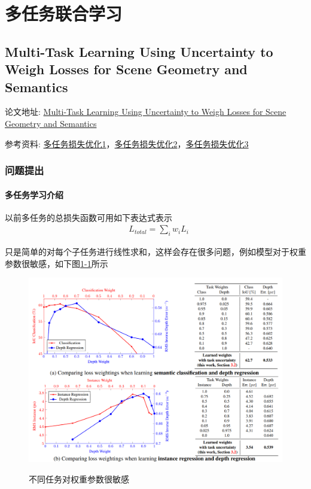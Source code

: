 \chapter{多任务联合学习}

\section{Multi-Task Learning Using Uncertainty to Weigh Losses for Scene Geometry and Semantics}

论文地址: \href{https://arxiv.org/abs/1705.07115v3}{Multi-Task Learning Using Uncertainty to Weigh Losses for Scene Geometry and Semantics}

参考资料: \href{https://zhuanlan.zhihu.com/p/65137250}{多任务损失优化1}，\href{https://blog.csdn.net/cdknight_happy/article/details/102618883}{多任务损失优化2}，\href{https://blog.csdn.net/qq_41214679/article/details/110750812}{多任务损失优化3}

\subsection{问题提出}

\subsubsection{多任务学习介绍}

以前多任务的总损失函数可用如下表达式表示
\begin{align}
& L_{total} = \sum_i w_iL_i
\end{align}

只是简单的对每个子任务进行线性求和，这样会存在很多问题，例如模型对于权重参数很敏感，如下图\href{fig:1-1}{1-1}所示
\begin{figure}
  \centering
  \includegraphics[width=4.5in]{figure/example/2.png}\\
  \caption{不同任务对权重参数很敏感}
  \label{fig:1-1}
\end{figure}

